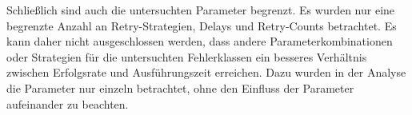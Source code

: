 Schließlich sind auch die untersuchten Parameter begrenzt.
Es wurden nur eine begrenzte Anzahl an Retry-Strategien, Delays und Retry-Counts betrachtet.
Es kann daher nicht ausgeschlossen werden, dass andere Parameterkombinationen oder Strategien für die untersuchten
Fehlerklassen ein besseres Verhältnis zwischen Erfolgsrate und Ausführungszeit erreichen.
Dazu wurden in der Analyse die Parameter nur einzeln betrachtet, ohne den Einfluss der Parameter aufeinander zu
beachten.